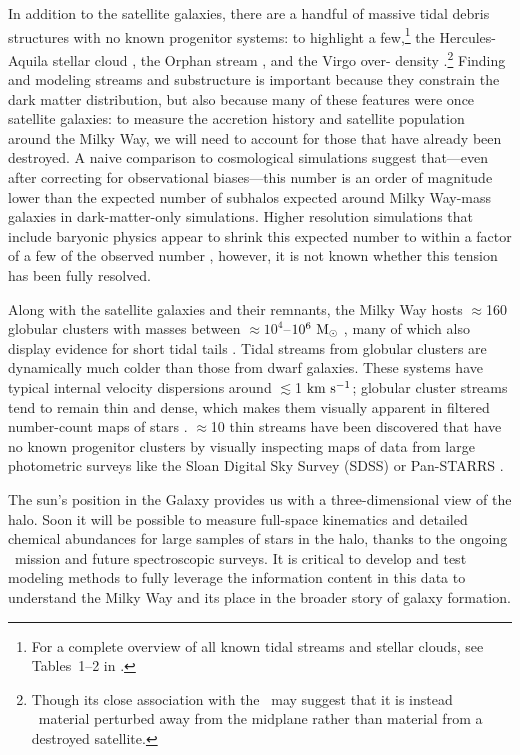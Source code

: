 In addition to the satellite galaxies, there are a handful of massive tidal
debris structures with no known progenitor systems: to highlight a
few,\footnote{For a complete overview of all known tidal streams and stellar
clouds, see Tables~1--2 in \cite{grillmair16}.} the Hercules-Aquila stellar
cloud \citep{belokurov07b}, the Orphan stream \citep{grillmair06b}, and the
Virgo over- density \citep{juric08}.\footnote{Though its close association with
the \mwdisk\ may suggest that it is instead \mwdisk\ material perturbed away
from the midplane rather than material from a destroyed satellite.} Finding and
modeling streams and substructure is important because they constrain the dark
matter distribution, but also because many of these features were once satellite
galaxies: to measure the accretion history and satellite population around the
Milky Way, we will need to account for those that have already been destroyed. A
naive comparison to cosmological simulations suggest that---even after
correcting for observational biases---this number is an order of magnitude lower
than the expected number of subhalos expected around Milky Way-mass galaxies in
dark-matter-only simulations. Higher resolution simulations that include
baryonic physics appear to shrink this expected number to within a factor of a
few of the observed number \citep[e.g.,][]{zolotov12, brooks13,sawala16},
however, it is not known whether this tension has been fully resolved.

Along with the satellite galaxies and their remnants, the Milky Way hosts
$\approx$160 globular clusters with masses between $\approx$$10^4$--$10^6~\mathrm{M}_\odot$
\citep{harris10}, many of which also display evidence for short tidal tails
\citep{grillmair95, leon00}. Tidal streams from globular clusters are
dynamically much colder than those from dwarf galaxies. These systems have
typical internal velocity dispersions around $\lesssim$1$~\mathrm{km}~\mathrm{s}^{-1}$; globular
cluster streams tend to remain thin and dense, which makes them visually
apparent in filtered number-count maps of stars \citep{grillmair08}. $\approx$10
thin streams have been discovered that have no known progenitor clusters by
visually inspecting maps of data from large photometric surveys like the Sloan
Digital Sky Survey (SDSS) or Pan-STARRS \citep[e.g.,][]{grillmair06a, bonaca12,
bernard14}.

The sun's position in the Galaxy provides us with a three-dimensional view of
the halo. Soon it will be possible to measure full-space kinematics and detailed
chemical abundances for large samples of stars in the halo, thanks to the
ongoing \gaia\ mission and future spectroscopic surveys. It is critical to
develop and test modeling methods to fully leverage the information content in
this data to understand the Milky Way and its place in the broader story of
galaxy formation.

